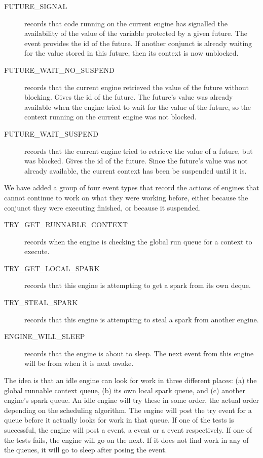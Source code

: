 \begin{description}
\item[FUTURE\_SIGNAL] records that code running on the current engine
has signalled the availability
of the value of the variable protected by a given future.
The event provides the id of the future.
If another conjunct is already waiting for the value stored in this future,
then its context is now unblocked.

\item[FUTURE\_WAIT\_NO\_SUSPEND] records that the current engine
retrieved the value of the future without blocking.
Gives the id of the future.
The future's value was already available
when the engine tried to wait for the value of the future,
so the context running on the current engine was not blocked.

\item[FUTURE\_WAIT\_SUSPEND] records that the current engine
tried to retrieve the value of a future, but was blocked.
Gives the id of the future.
Since the future's value was not already available,
the current context has been be suspended until it is.

\end{description}

We have added a group of four event types
that record the actions of engines
that cannot continue to work on what they were working before,
either because the conjunct they were executing finished,
or because it suspended.

\begin{description}

\item[TRY\_GET\_RUNNABLE\_CONTEXT] records when the engine is checking the
global run queue for a context to execute.

\item[TRY\_GET\_LOCAL\_SPARK] records that this engine is attempting to get
a spark from its own deque.

\item[TRY\_STEAL\_SPARK] records that this engine is attempting to steal a
spark from another engine.

\item[ENGINE\_WILL\_SLEEP] records that the engine is about to sleep.
The next event from this engine will be from when it is next awake.

\end{description}

\noindent
The idea is that an idle engine can look for work in three different places:
(a) the global runnable context queue,
(b) its own local spark queue, and
(c) another engine's spark queue.
An idle engine will try these in some order,
the actual order depending on the scheduling algorithm.
The engine will post the try event for a queue
before it actually looks for work in that queue.
If one of the tests is successful, the engine will post
a  event, a  event or a
 event respectively.
If one of the tests fails, the engine will go on the next.
If it does not find work in any of the queues,
it will go to sleep after posing the  event.

